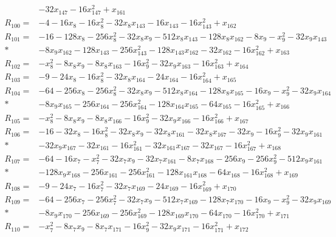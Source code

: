 \begin{align*}
&-32x_{147}-16x_{147}^{2}+x_{161}\\[3pt]
R_{100}={}&-4-16x_{8}-16x_{8}^{2}-32x_{8}x_{143}-16x_{143}-16x_{143}^{2}+x_{162}\\[3pt]
R_{101}={}&-16-128x_{8}-256x_{8}^{2}-32x_{8}x_{9}-512x_{8}x_{143}-128x_{8}x_{162}-8x_{9}-x_{9}^{2}-32x_{9}x_{143}\\*
&-8x_{9}x_{162}-128x_{143}-256x_{143}^{2}-128x_{143}x_{162}-32x_{162}-16x_{162}^{2}+x_{163}\\[3pt]
R_{102}={}&-x_{8}^{2}-8x_{8}x_{9}-8x_{8}x_{163}-16x_{9}^{2}-32x_{9}x_{163}-16x_{163}^{2}+x_{164}\\[3pt]
R_{103}={}&-9-24x_{8}-16x_{8}^{2}-32x_{8}x_{164}-24x_{164}-16x_{164}^{2}+x_{165}\\[3pt]
R_{104}={}&-64-256x_{8}-256x_{8}^{2}-32x_{8}x_{9}-512x_{8}x_{164}-128x_{8}x_{165}-16x_{9}-x_{9}^{2}-32x_{9}x_{164}\\*
&-8x_{9}x_{165}-256x_{164}-256x_{164}^{2}-128x_{164}x_{165}-64x_{165}-16x_{165}^{2}+x_{166}\\[3pt]
R_{105}={}&-x_{8}^{2}-8x_{8}x_{9}-8x_{8}x_{166}-16x_{9}^{2}-32x_{9}x_{166}-16x_{166}^{2}+x_{167}\\[3pt]
R_{106}={}&-16-32x_{8}-16x_{8}^{2}-32x_{8}x_{9}-32x_{8}x_{161}-32x_{8}x_{167}-32x_{9}-16x_{9}^{2}-32x_{9}x_{161}\\*
&-32x_{9}x_{167}-32x_{161}-16x_{161}^{2}-32x_{161}x_{167}-32x_{167}-16x_{167}^{2}+x_{168}\\[3pt]
R_{107}={}&-64-16x_{7}-x_{7}^{2}-32x_{7}x_{9}-32x_{7}x_{161}-8x_{7}x_{168}-256x_{9}-256x_{9}^{2}-512x_{9}x_{161}\\*
&-128x_{9}x_{168}-256x_{161}-256x_{161}^{2}-128x_{161}x_{168}-64x_{168}-16x_{168}^{2}+x_{169}\\[3pt]
R_{108}={}&-9-24x_{7}-16x_{7}^{2}-32x_{7}x_{169}-24x_{169}-16x_{169}^{2}+x_{170}\\[3pt]
R_{109}={}&-64-256x_{7}-256x_{7}^{2}-32x_{7}x_{9}-512x_{7}x_{169}-128x_{7}x_{170}-16x_{9}-x_{9}^{2}-32x_{9}x_{169}\\*
&-8x_{9}x_{170}-256x_{169}-256x_{169}^{2}-128x_{169}x_{170}-64x_{170}-16x_{170}^{2}+x_{171}\\[3pt]
R_{110}={}&-x_{7}^{2}-8x_{7}x_{9}-8x_{7}x_{171}-16x_{9}^{2}-32x_{9}x_{171}-16x_{171}^{2}+x_{172}\\[3pt]

\end{align*}
